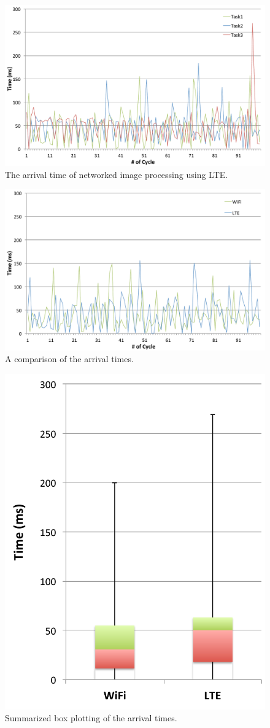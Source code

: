 \begin{figure}[!t]
 \centering
 \includegraphics[width=0.8\hsize]{fig/No11_TIPiC_serv_cycle_LTE.pdf}
 \caption{The arrival time of networked image processing using LTE.}
 \label{fig:no11}
\end{figure}

\begin{figure}[!t]
 \centering
 \includegraphics[width=0.8\hsize]{fig/No12_TIPiC_serv_cycle_compare_WiFi_and_LTE.pdf}
 \caption{A comparison of the arrival times.}
 \label{fig:no12}
\end{figure}

\begin{figure}[!t]
 \centering
 \includegraphics[width=0.5\hsize]{fig/No13_TIPiC_boxplot_compare_WiFi_and_LTE.pdf}
 \caption{Summarized box plotting of the arrival times.}
 \label{fig:no13}
\end{figure}

